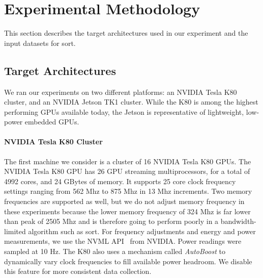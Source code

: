 \section{Experimental Methodology}

This section describes the 
target architectures used in our experiment
and the input datasets for sort.

\subsection{Target Architectures}

We ran our experiments on two different platforms: an NVIDIA Tesla K80
cluster, and an NVIDIA Jetson TK1 cluster. While the K80 is among
the highest performing GPUs available today, the Jetson is representative
of lightweight, low-power embedded GPUs.



\paragraph{NVIDIA Tesla K80 Cluster}
The first machine we consider is a cluster of 16 NVIDIA Tesla K80 GPUs.
The NVIDIA Tesla K80 GPU
has 26 GPU streaming multiprocessors, for a total of 4992 cores, 
and 24 GBytes of memory.
It supports 25 core clock frequency settings ranging from 562 Mhz to 875 Mhz
in 13 Mhz increments.
Two memory frequencies are supported as well, 
but we do not adjust memory frequency in these experiments 
because the lower memory frequency of 324 Mhz
is far lower than peak of 2505 Mhz
and is therefore going to perform poorly in a bandwidth-limited
algorithm such as sort.
For frequency adjustments and energy and power measurements, we use the NVML
API~\cite{} from NVIDIA. Power readings were sampled at 10 Hz.
The K80 also uses a mechanism called \textit{AutoBoost} to dynamically
vary clock frequencies to fill available power headroom. We disable this feature
for more consistent data collection.


